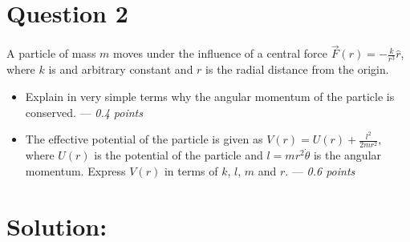 \section*{Question 2}
A particle of mass $m$ moves under the influence of a central force $\vec{F}(r)=-\frac{k}{r^3}\hat{r}$, where $k$ is and arbitrary constant and $r$ is the radial distance from the origin.

\begin{itemize}
    \item[\textbf{(a)}] Explain in very simple terms why the angular momentum of the particle is conserved. --- \textit{0.4 points}
    \item[\textbf{(b)}] The effective potential of the particle is given as $V(r)=U(r)+\frac{l^2}{2mr^2}$, where $U(r)$ is the potential of the particle and $l=mr^2\dot{\theta}$ is the angular momentum. Express $V(r)$ in terms of $k$, $l$, $m$ and $r$. --- \textit{0.6 points}
\end{itemize}

\section*{Solution:}
